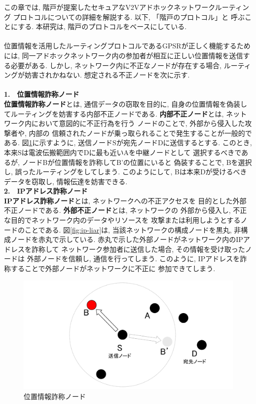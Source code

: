 この章では, 階戸が提案したセキュアなV2Vアドホックネットワークルーティング
プロトコル\cite{shinato}についての詳細を解説する. 以下, 「階戸のプロトコル」と
呼ぶことにする. 本研究は, 階戸のプロトコルをベースにしている.\\ 

\\[0.5em]
\indent 位置情報を活用したルーティングプロトコルであるGPSRが正しく機能するためには, 
同一アドホックネットワーク内の参加者が相互に正しい位置情報を送信する必要がある. 
しかし, ネットワーク内に不正なノードが存在する場合, ルーティングが妨害されかねない. 
想定される不正ノードを次に示す. \\[0.5em]
\\[0.5em]
\noindent \textbf{1.　位置情報詐称ノード}\\
\indent \textbf{位置情報詐称ノード}とは, 通信データの窃取を目的に, 
自身の位置情報を偽装してルーティングを妨害する内部不正ノードである. 
\textbf{内部不正ノード}とは, ネットワーク内において意図的に不正行為を行う
ノードのことで, 外部から侵入した攻撃者や, 内部の
信頼されたノードが乗っ取られることで発生することが一般的である. 
図\ref{fig:position-liar}に示すように, 送信ノードSが宛先ノードDに送信するとする. 
このとき, 本来Sは電波伝搬範囲内でDに最も近いAを中継ノードとして
選択するべきであるが, ノードBが位置情報を詐称してB'の位置にいると
偽装することで, Bを選択し, 誤ったルーティングをしてしまう. 
このようにして, Bは本来Dが受けるべきデータを窃取し, 
情報伝達を妨害できる.\\

\noindent \textbf{2.　IPアドレス詐称ノード}\\
\indent \textbf{IPアドレス詐称ノード}とは, ネットワークへの不正アクセスを
目的とした外部不正ノードである. \textbf{外部不正ノード}とは, ネットワークの
外部から侵入し, 不正な目的でネットワーク内のデータやリソースを
攻撃または利用しようとするノードのことである. 図\ref{fig:ip-liar}は,  
当該ネットワークの構成ノードを黒丸, 非構成ノードを赤丸で示している. 
赤丸で示した外部ノードがネットワーク内のIPアドレスを詐称して
ネットワーク参加者に送信した場合, その情報を受け取ったノードは
外部ノードを信頼し, 通信を行ってしまう. このように, 
IPアドレスを詐称することで外部ノードがネットワークに不正に
参加できてしまう. 
\newpage
\begin{figure}
  \centering
  \includegraphics[scale=0.6]{figures/position-liar.png}
  \caption{位置情報詐称ノード\cite{shinato}}
  \label{fig:position-liar}
\end{figure}

